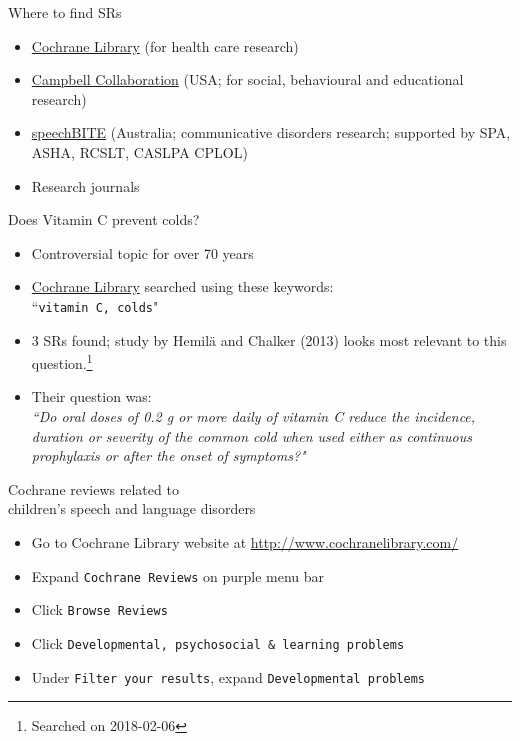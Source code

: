 \documentclass{beamer}
\begin{document}
% 
\begin{frame}{Where to find SRs}
	\begin{itemize}
	\item \href{http://www.cochranelibrary.com/cochrane-database-of-systematic-reviews/}{Cochrane Library} (for health care research)
	\item \href{https://www.campbellcollaboration.org/}{Campbell Collaboration} (USA; for social, behavioural and educational research)
	\item \href{http://speechbite.com/}{speechBITE} (Australia; communicative disorders research; supported by SPA, ASHA, RCSLT, CASLPA CPLOL)
	\item Research journals
	\end{itemize}
\end{frame}

% 
\begin{frame}{Does Vitamin C prevent colds?}
	\begin{itemize}
	\item Controversial topic for over 70 years
	\item \href{http://onlinelibrary.wiley.com/cochranelibrary/search/}{Cochrane Library} searched using these keywords:\\``\texttt{vitamin C, colds}" 
	\item 3 SRs found; study by Hemil\"a and Chalker (2013) looks most relevant to this question.\footnote{\tiny{Searched on 2018-02-06}}
	\item Their question was: \\
	\emph{``Do oral doses of 0.2 g or more daily of vitamin C reduce the incidence, duration or severity of the common cold when used either as continuous prophylaxis or after the onset of symptoms?"}
	\end{itemize}
\end{frame}

% 
\begin{frame}{Cochrane reviews related to \\ children's speech and language disorders}
	\begin{itemize}
	\item Go to Cochrane Library website at \url{http://www.cochranelibrary.com/}
	\item Expand \texttt{Cochrane Reviews} on purple menu bar
	\item Click \texttt{Browse Reviews}
	\item Click \texttt{Developmental, psychosocial \& learning problems}
	\item Under \texttt{Filter your results}, expand \texttt{Developmental problems}
	\end{itemize}
\end{frame}
\end{document}
